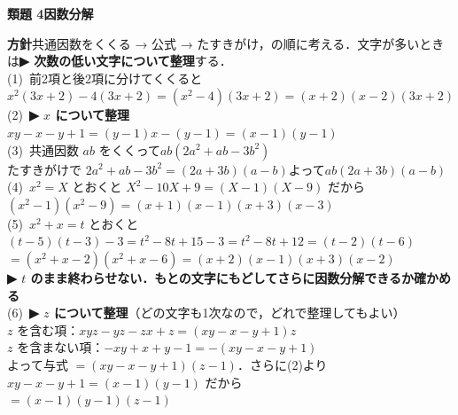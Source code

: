 \documentclass[a4paper,11pt]{ltjsarticle}
\newcommand{\ans}[2]{\Needspace{5\baselineskip}\vspace{6pt}%
  {\sffamily\bfseries 類題 #1\quad #2}\par}
\newcommand{\point}[1]{\textsf{\bfseries ▶ #1}}
\begin{document}
\ans{4}{因数分解}
\begin{kai}
\textbf{方針}\quad 共通因数をくくる → 公式 → たすきがけ，の順に考える．文字が多いときは\point{次数の低い文字について整理}する．\\[2pt]
(1)\ 前2項と後2項に分けてくくると\\
\hspace*{1.5em}$x^2(3x+2)-4(3x+2)=(x^2-4)(3x+2)=(x+2)(x-2)(3x+2)$\\[2pt]
(2)\ \point{$x$ について整理}\quad $xy-x-y+1=(y-1)x-(y-1)=(x-1)(y-1)$\\[2pt]
(3)\ 共通因数 $ab$ をくくって\quad $ab(2a^2+ab-3b^2)$\\
\hspace*{1.5em}たすきがけで $2a^2+ab-3b^2=(2a+3b)(a-b)$\quad よって\quad $ab(2a+3b)(a-b)$\\[2pt]
(4)\ $x^2=X$ とおくと $X^2-10X+9=(X-1)(X-9)$ だから\\
\hspace*{1.5em}$(x^2-1)(x^2-9)=(x+1)(x-1)(x+3)(x-3)$\\[2pt]
(5)\ $x^2+x=t$ とおくと\quad $(t-5)(t-3)-3=t^2-8t+15-3=t^2-8t+12=(t-2)(t-6)$\\
\hspace*{1.5em}$=(x^2+x-2)(x^2+x-6)=(x+2)(x-1)(x+3)(x-2)$\\
\hspace*{1.5em}\point{$t$ のまま終わらせない．もとの文字にもどしてさらに因数分解できるか確かめる}\\[2pt]
(6)\ \point{$z$ について整理}（どの文字も1次なので，どれで整理してもよい）\\
\hspace*{1.5em}$z$ を含む項：$xyz-yz-zx+z=(xy-x-y+1)z$\\
\hspace*{1.5em}$z$ を含まない項：$-xy+x+y-1=-(xy-x-y+1)$\\
\hspace*{1.5em}よって与式 $=(xy-x-y+1)(z-1)$．さらに(2)より $xy-x-y+1=(x-1)(y-1)$ だから\\
\hspace*{1.5em}$=(x-1)(y-1)(z-1)$
\end{kai}
\end{document}
